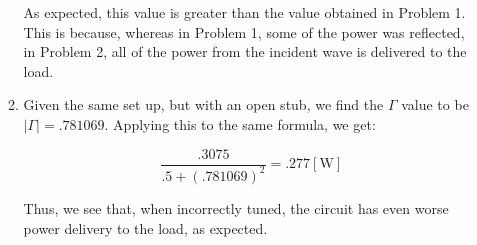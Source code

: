 \begin{enumerate}
\begin{enumerate}
        As expected, this value is greater than the value obtained in Problem 1. This is because, whereas in Problem 1, some of the power was reflected, in Problem 2, all of the power from the incident wave is delivered to the load.

      \item 

        Given the same set up, but with an open stub, we find the $\Gamma$ value to be $|\Gamma|=.781069$. Applying this to the same formula, we get:

        $$\frac{.3075}{.5+(.781069)^2}=.277[\si{\watt}]$$

        Thus, we see that, when incorrectly tuned, the circuit has even worse power delivery to the load, as expected.

    \end{enumerate}

\end{enumerate}



